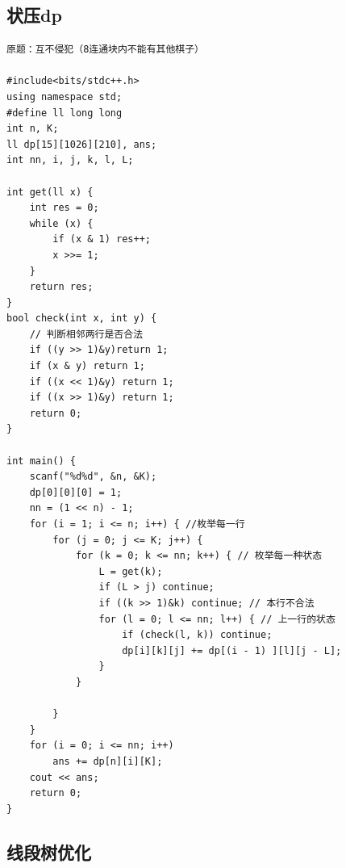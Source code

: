 \documentclass[11pt,a4paper]{ctexart}
\begin{document}
\subsection{状压dp}

\begin{lstlisting}
原题：互不侵犯（8连通块内不能有其他棋子）

#include<bits/stdc++.h>
using namespace std;
#define ll long long
int n, K;
ll dp[15][1026][210], ans;
int nn, i, j, k, l, L;

int get(ll x) {
	int res = 0;
	while (x) {
		if (x & 1) res++;
		x >>= 1;
	}
	return res;
}
bool check(int x, int y) {
	// 判断相邻两行是否合法
	if ((y >> 1)&y)return 1;
	if (x & y) return 1;
	if ((x << 1)&y) return 1;
	if ((x >> 1)&y) return 1;
	return 0;
}

int main() {
	scanf("%d%d", &n, &K);
	dp[0][0][0] = 1;
	nn = (1 << n) - 1;
	for (i = 1; i <= n; i++) { //枚举每一行
		for (j = 0; j <= K; j++) {
			for (k = 0; k <= nn; k++) { // 枚举每一种状态
				L = get(k);
				if (L > j) continue;
				if ((k >> 1)&k) continue; // 本行不合法
				for (l = 0; l <= nn; l++) { // 上一行的状态
					if (check(l, k)) continue;
					dp[i][k][j] += dp[(i - 1) ][l][j - L];
				}
			}

		}
	}
	for (i = 0; i <= nn; i++)
		ans += dp[n][i][K];
	cout << ans;
	return 0;
}
\end{lstlisting}

\subsection{线段树优化}
\end{document}
